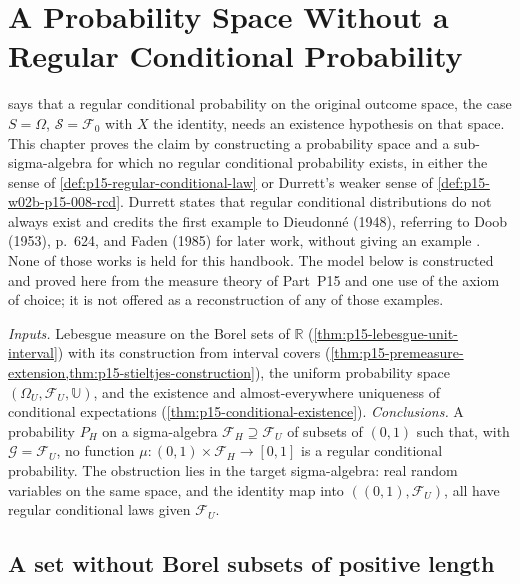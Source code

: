 \chapter{A Probability Space Without a Regular Conditional Probability}
\label{sec:p15-w02c-p15-008-no-rcp}

 says that a regular conditional
probability on the original outcome space, the case \(S=\Omega\),
\(\mathcal S=\mathcal F_0\) with \(X\) the identity, needs an existence
hypothesis on that space. This chapter proves the claim by constructing a
probability space and a sub-sigma-algebra for which no regular conditional
probability exists, in either the sense of
\cref{def:p15-regular-conditional-law} or Durrett's weaker sense of
\cref{def:p15-w02b-p15-008-rcd}. Durrett states that regular conditional
distributions do not always exist and credits the first example to
Dieudonn\'e (1948), referring to Doob (1953), p.~624, and Faden (1985)
for later work, without giving an example
\cite[p.~214]{DurrettPTEAuthor2019}. None of those works is held for
this handbook. The model below is constructed and proved here from the
measure theory of Part~P15 and one use of the axiom of choice; it is not
offered as a reconstruction of any of those examples.

\emph{Inputs.} Lebesgue measure on the Borel sets of \(\mathbb R\)
(\cref{thm:p15-lebesgue-unit-interval}) with its construction from
interval covers (\cref{thm:p15-premeasure-extension,thm:p15-stieltjes-construction}),
the uniform probability space \((\Omega_U,\mathcal F_U,\mathbb U)\), and
the existence and almost-everywhere uniqueness of conditional expectations
(\cref{thm:p15-conditional-existence}).
\emph{Conclusions.} A probability \(P_H\) on a sigma-algebra
\(\mathcal F_H\supseteq\mathcal F_U\) of subsets of \((0,1)\) such that,
with \(\mathcal G=\mathcal F_U\), no function
\(\mu:(0,1)\times\mathcal F_H\to[0,1]\) is a regular conditional
probability. The obstruction lies in the target sigma-algebra: real random
variables on the same space, and the identity map into
\(((0,1),\mathcal F_U)\), all have regular conditional laws given
\(\mathcal F_U\).

\section{A set without Borel subsets of positive length}
\label{sec:p15-w02c-p15-008-thick-set}

